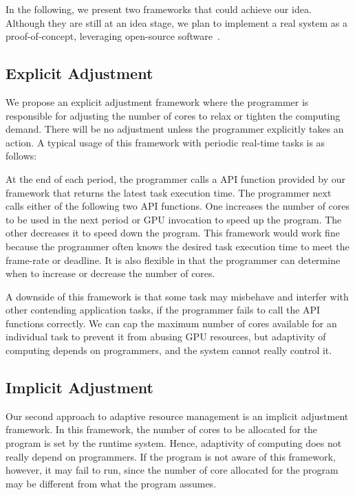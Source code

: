 \documentclass[times, 10pt, twocolumn]{article}
\begin{document}
In the following, we present two frameworks that could achieve our idea.
Although they are still at an idea stage, we plan to implement a real
system as a proof-of-concept, leveraging open-source
software~\cite{Kato_OSPERT11}.

\subsection{Explicit Adjustment}

We propose an explicit adjustment framework where the programmer is
responsible for adjusting the number of cores to relax or tighten
the computing demand.
There will be no adjustment unless the programmer explicitly takes an
action.
A typical usage of this framework with periodic real-time tasks is as
follows:

At the end of each period, the programmer calls a API function provided
by our framework that returns the latest task execution time.
The programmer next calls either of the following two API functions.
One increases the number of cores to be used in the next period or GPU
invocation to speed up the program.
The other decreases it to speed down the program.
This framework would work fine because the programmer often knows the
desired task execution time to meet the frame-rate or deadline.
It is also flexible in that the programmer can determine when to
increase or decrease the number of cores.

A downside of this framework is that some task may misbehave
and interfer with other contending application tasks, if the programmer
fails to call the API functions correctly.
We can cap the maximum number of cores available for an individual task
to prevent it from abusing GPU resources, but adaptivity of computing
depends on programmers, and the system cannot really control it.

\subsection{Implicit Adjustment}

Our second approach to adaptive resource management is an implicit
adjustment framework.
In this framework, the number of cores to be allocated for the program
is set by the runtime system.
Hence, adaptivity of computing does not really depend on programmers.
If the program is not aware of this framework, however, it may fail to
run, since the number of core allocated for the program may be different
from what the program assumes.
\end{document}
